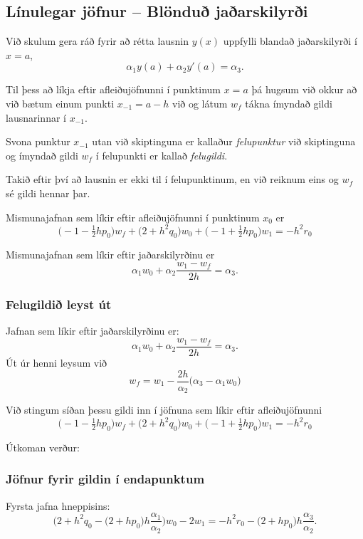 \documentclass[icelandic,a4paper,12pt]{article}
\begin{document}
\subsection{Línulegar jöfnur -- Blönduð jaðarskilyrði}
Við skulum gera ráð fyrir að rétta lausnin $y(x)$ uppfylli blandað
jaðarskilyrði í $x=a$, 
$$
\alpha_1y(a)+\alpha_2 y'(a)=\alpha_3.
$$

\pause
Til þess að líkja eftir afleiðujöfnunni í punktinum $x=a$ þá hugsum
við okkur að við bætum einum punkti $x_{-1}=a-h$ við og látum 
$w_f$ tákna ímyndað gildi lausnarinnar í $x_{-1}$.  

\pause
\smallskip
Svona punktur $x_{-1}$ utan við skiptinguna er kallaður 
{\it felupunktur} við skiptinguna og ímyndað gildi $w_f$ í 
felupunkti er kallað  {\it felugildi}.   \pause

\smallskip
Takið eftir því að lausnin er ekki til í felupunktinum, en við reiknum
eins og $w_f$ sé gildi hennar þar. 

\pause
\smallskip
Mismunajafnan sem líkir eftir afleiðujöfnunni í punktinum $x_0$  er 
$$
\big(-1-\tfrac 12 hp_0\big)w_f+\big(2+h^2 q_0\big)w_0
+\big(-1+\tfrac 12 hp_0\big)w_1=-h^2r_0
$$

\pause
Mismunajafnan sem líkir eftir jaðarskilyrðinu er
$$
\alpha_1w_0+\alpha_2 \dfrac{w_1-w_f}{2h}=\alpha_3.
$$



\subsubsection{Felugildið leyst út} 
Jafnan sem líkir eftir jaðarskilyrðinu er:
$$
\alpha_1w_0+\alpha_2 \dfrac{w_1-w_f}{2h}=\alpha_3.
$$
Út úr henni leysum við
$$
w_f=w_1-\dfrac{2h}{\alpha_2}\big(\alpha_3-\alpha_1w_0\big)
$$

\pause
Við stingum síðan þessu gildi inn í jöfnuna sem líkir eftir
afleiðujöfnunni 
$$
\big(-1-\tfrac 12 hp_0\big)w_f+\big(2+h^2 q_0\big)w_0
+\big(-1+\tfrac 12 hp_0\big)w_1=-h^2r_0
$$

\pause
Útkoman verður:



\subsubsection{Jöfnur fyrir gildin í endapunktum} 
Fyrsta jafna hneppisins:
$$
\bigg(2+h^2q_0-\big(2+hp_0\big)h\dfrac{\alpha_1}{\alpha_2}\bigg)w_0
-2w_1=-h^2r_0-\big(2+hp_0\big)h\dfrac{\alpha_3}{\alpha_2}.
$$
\end{document}
